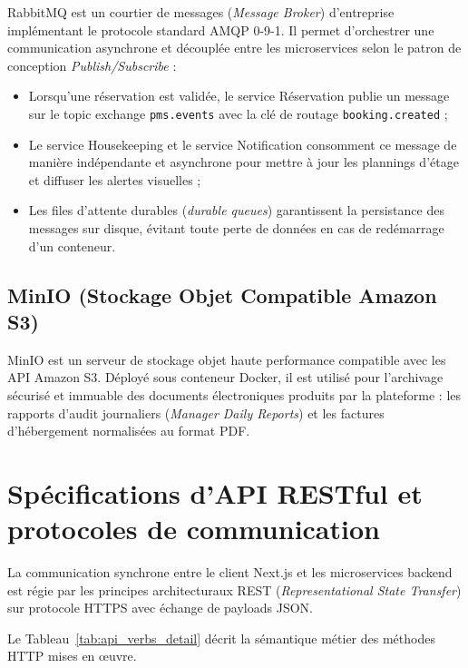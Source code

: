 RabbitMQ est un courtier de messages (\textit{Message Broker}) d'entreprise implémentant le protocole standard AMQP 0-9-1. Il permet d'orchestrer une communication asynchrone et découplée entre les microservices selon le patron de conception \textit{Publish/Subscribe} :
\begin{itemize}
    \item Lorsqu'une réservation est validée, le service Réservation publie un message sur le topic exchange \texttt{pms.events} avec la clé de routage \texttt{booking.created} ;
    \item Le service Housekeeping et le service Notification consomment ce message de manière indépendante et asynchrone pour mettre à jour les plannings d'étage et diffuser les alertes visuelles ;
    \item Les files d'attente durables (\textit{durable queues}) garantissent la persistance des messages sur disque, évitant toute perte de données en cas de redémarrage d'un conteneur.
\end{itemize}

\subsection{MinIO (Stockage Objet Compatible Amazon S3)}

MinIO est un serveur de stockage objet haute performance compatible avec les API Amazon S3. Déployé sous conteneur Docker, il est utilisé pour l'archivage sécurisé et immuable des documents électroniques produits par la plateforme : les rapports d'audit journaliers (\textit{Manager Daily Reports}) et les factures d'hébergement normalisées au format PDF.

\section{Spécifications d'API RESTful et protocoles de communication}

La communication synchrone entre le client Next.js et les microservices backend est régie par les principes architecturaux REST (\textit{Representational State Transfer}) sur protocole HTTPS avec échange de payloads JSON.

Le Tableau~\ref{tab:api_verbs_detail} décrit la sémantique métier des méthodes HTTP mises en œuvre.

